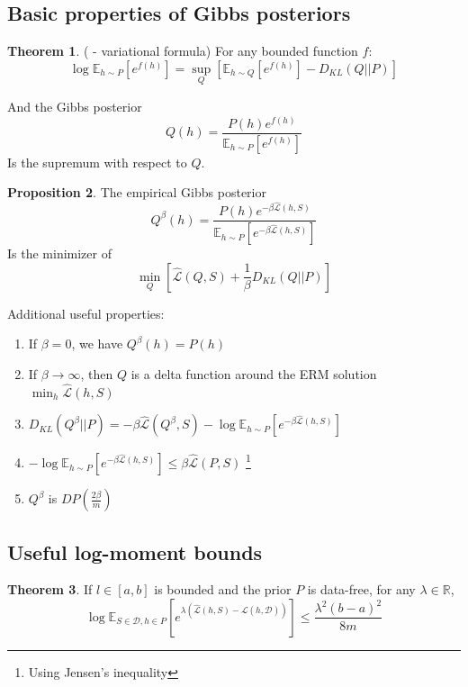 \documentclass{article}
\theoremstyle{definition}
\newtheorem{theorem}{Theorem}[section]
\newtheorem{proposition}[theorem]{Proposition}
\newcommand{\Expect}[2]{\mathbb{E}_{#1}\left [#2 \right ]}
\begin{document}
\subsection{Basic properties of Gibbs posteriors} \label{append:gibbs-properties}

\begin{theorem} (\citet{Donsker1975} - variational formula)
	For any bounded function $f$:
	\begin{equation*} 
	\log \Expect{h\sim P}{e^{f(h)}}=\sup_{Q}\left[\Expect{h\sim Q}{e^{f(h)}}-D_{KL}(Q||P) \right ]
	\end{equation*}
	
	And the Gibbs posterior 
	$$Q(h)=\frac{P(h)e^{f(h)}}{\Expect{h\sim P}{e^{f(h)}}}$$ 
	Is the supremum with respect to $Q$.
\end{theorem}

\begin{proposition}
	The empirical Gibbs posterior 
	$$Q^\beta(h)=\frac{P(h)e^{-\beta \hat{\mathcal{L}}(h, S)}}{\Expect{h\sim P}{e^{-\beta \hat{\mathcal{L}}(h, S)}}}$$ 
	Is the minimizer of $$\min_{Q}\left[\hat{\mathcal{L}}(Q, S)+\frac{1}{\beta}D_{KL}(Q||P)\right ]$$
\end{proposition}

Additional useful properties:
\begin{enumerate}
	\item If $\beta=0$, we have $Q^\beta(h)=P(h)$
	\item If $\beta\rightarrow \infty$, then $Q$ is a delta function around the ERM solution $\min_h \hat{\mathcal{L}}(h,S)$
	\item $D_{KL}(Q^\beta||P)=-\beta\hat{\mathcal{L}}(Q^\beta, S)-\log\Expect{h\sim P}{e^{-\beta \hat{\mathcal{L}}(h, S)}}$
	\item $-\log\Expect{h\sim P}{e^{-\beta \hat{\mathcal{L}}(h, S)}}\leq \beta\hat{\mathcal{L}}(P,S)$ \footnote{Using Jensen's inequality}
	\item $Q^\beta$ is $DP(\frac{2\beta}{m})$ \citep{McSherry2007}
\end{enumerate}

\subsection{Useful log-moment bounds} \label{append:log-moment-stuff}

\begin{theorem}
	If $l\in[a,b]$ is bounded and the prior $P$ is data-free, for any $\lambda\in \mathbb{R}$,
	$$\log \Expect{S\in \mathcal{D}, h\in P}{e^{\lambda(\hat{\mathcal{L}}(h,S)-\mathcal{L}(h,\mathcal{D}))}} \leq \frac{\lambda^2(b-a)^2}{8m}$$
\end{theorem}
\end{document}
